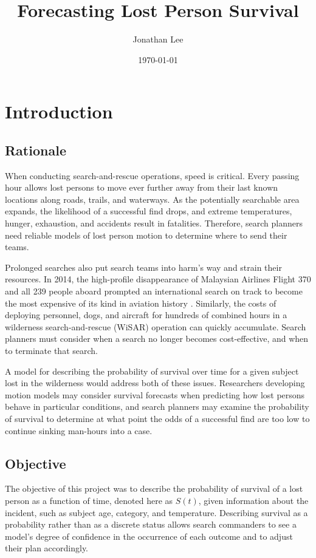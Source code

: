 \documentclass[12pt,titlepage]{article}
\begin{document}
  \title{Forecasting Lost Person Survival}
  \author{Jonathan Lee}
  \date{\today}
  \maketitle


  \section{Introduction}
    \subsection{Rationale}
      When conducting search-and-rescue operations, speed is critical. Every
      passing hour allows lost persons to move ever further away from their
      last known locations along roads, trails, and waterways. As the
      potentially searchable area expands, the likelihood of a successful find
      drops, and extreme temperatures, hunger, exhaustion, and accidents result
      in fatalities. Therefore, search planners need reliable models of lost
      person motion to determine where to send their teams.

      Prolonged searches also put search teams into harm's way and strain their
      resources. In 2014, the high-profile disappearance of Malaysian Airlines
      Flight 370 and all 239 people aboard prompted an international search on
      track to become the most expensive of its kind in aviation history
      \cite{semple}. Similarly, the costs of deploying personnel, dogs, and
      aircraft for hundreds of combined hours in a wilderness search-and-rescue
      (WiSAR) operation can quickly accumulate. Search planners must consider
      when a search no longer becomes cost-effective, and when to terminate
      that search.

      A model for describing the probability of survival over time for a given
      subject lost in the wilderness would address both of these issues.
      Researchers developing motion models may consider survival forecasts when
      predicting how lost persons behave in particular conditions, and search
      planners may examine the probability of survival to determine at what
      point the odds of a successful find are too low to continue sinking
      man-hours into a case.

    \subsection{Objective}
      The objective of this project was to describe the probability of survival
      of a lost person as a function of time, denoted here as $S(t)$, given
      information about the incident, such as subject age, category, and
      temperature. Describing survival as a probability rather than as a
      discrete status allows search commanders to see a model's degree of
      confidence in the occurrence of each outcome and to adjust their plan
      accordingly.
\end{document}

